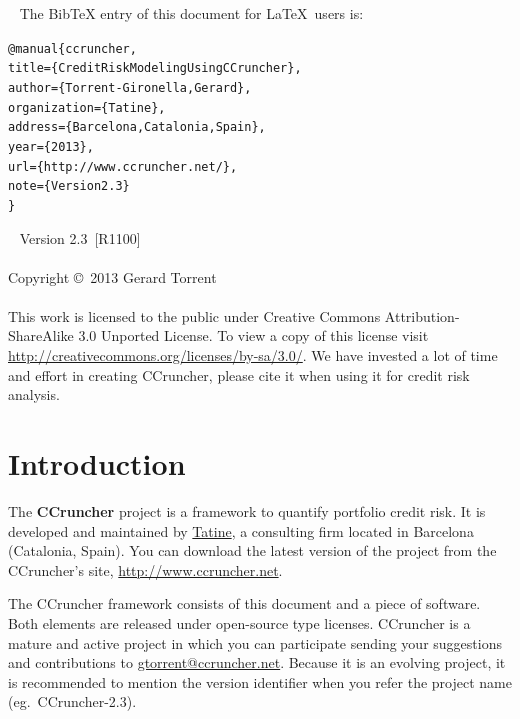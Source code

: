 \documentclass[11pt,fleqn]{book} %
\def\numversion{2.3}
\def\svnversion{R1100}
\begin{document}
~\vfill
The BibTeX entry of this document for \LaTeX\ users is:
\begin{alltt}
@manual\{ccruncher,
    title = \{Credit Risk Modeling Using CCruncher\},
    author = \{Torrent-Gironella, Gerard\},
    organization = \{Tatine\},
    address = \{Barcelona, Catalonia, Spain\},
    year = \{2013\},
    url = \{http://www.ccruncher.net/\},
    note = \{Version \numversion\}
\}
\end{alltt}

~\vfill
\thispagestyle{empty}
\noindent Version \numversion\ [\svnversion]\\ 
\\
\noindent Copyright \copyright\ 2013 Gerard Torrent\\
\\
\noindent 
This work is licensed to the public under Creative Commons 
Attribution-ShareAlike 3.0 Unported License. To view a copy 
of this license visit 
\url{http://creativecommons.org/licenses/by-sa/3.0/}.
We have invested a lot of time and effort in creating CCruncher, 
please cite it when using it for credit risk analysis.


\pagestyle{empty}
\setcounter{tocdepth}{1}
\tableofcontents
\cleardoublepage
\pagestyle{fancy}


\chapter{Introduction}

The \textbf{CCruncher} project is a framework to quantify portfolio credit 
risk. It is developed and maintained by \href{http://www.tatine.es}{Tatine}, 
a consulting firm located in Barcelona (Catalonia, Spain). You can download 
the latest version of the project from the CCruncher's site, 
\url{http://www.ccruncher.net}.

The CCruncher framework consists of this document and a piece of software. 
Both elements are released under open-source type licenses. CCruncher is a 
mature and active project in which you can participate sending your 
suggestions and contributions to \href{mailto:gtorrent@ccruncher.net}
{gtorrent@ccruncher.net}. Because it is an evolving project, it is recommended 
to mention the version identifier when you refer the project name 
(eg.\ CCruncher-\numversion).
\end{document}
